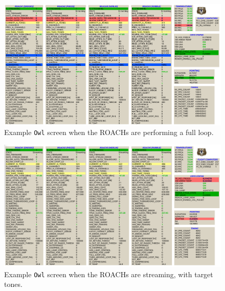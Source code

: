 \begin{figure}
\includegraphics[width=\linewidth,keepaspectratio]{./figures/software/full_loop}
\caption[Example OWL screen when the ROACHs are performing a full loop.]{Example \texttt{Owl} screen when the ROACHs are performing a full loop.}
\label{fig:doing full loop screen}
\end{figure}

\begin{figure}
\includegraphics[width=\linewidth,keepaspectratio]{./figures/software/has_targ_tones}
\caption[Example OWL screen when the ROACHs are streaming, with target tones.]{Example \texttt{Owl} screen when the ROACHs are streaming, with target tones.}
\label{fig:has targ tones screen}
\end{figure}


